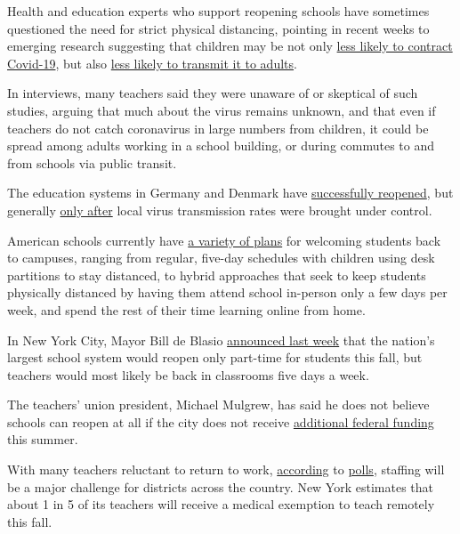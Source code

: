 Health and education experts who support reopening schools have
sometimes questioned the need for strict physical distancing, pointing
in recent weeks to emerging research suggesting that children may be not
only \href{https://pubmed.ncbi.nlm.nih.gov/32546824/}{less likely to
contract Covid-19}, but also
\href{https://pediatrics.aappublications.org/content/early/2020/07/08/peds.2020-004879}{less
likely to transmit it to adults}.

In interviews, many teachers said they were unaware of or skeptical of
such studies, arguing that much about the virus remains unknown, and
that even if teachers do not catch coronavirus in large numbers from
children, it could be spread among adults working in a school building,
or during commutes to and from schools via public transit.

The education systems in Germany and Denmark have
\href{https://www.nytimes.com/2020/05/10/world/europe/reopen-schools-germany.html}{successfully
reopened}, but generally
\href{https://www.sciencemag.org/news/2020/07/school-openings-across-globe-suggest-ways-keep-coronavirus-bay-despite-outbreaks}{only
after} local virus transmission rates were brought under control.

American schools currently have
\href{https://www.nytimes.com/2020/06/26/us/coronavirus-schools-reopen-fall.html}{a
variety of plans} for welcoming students back to campuses, ranging from
regular, five-day schedules with children using desk partitions to stay
distanced, to hybrid approaches that seek to keep students physically
distanced by having them attend school in-person only a few days per
week, and spend the rest of their time learning online from home.

In New York City, Mayor Bill de Blasio
\href{https://www.nytimes.com/2020/07/08/nyregion/nyc-schools-reopening-plan.html}{announced
last week} that the nation's largest school system would reopen only
part-time for students this
fall\href{https://www.nytimes.com/2020/07/08/nyregion/nyc-schools-reopening-plan.html}{,}
but teachers would most likely be back in classrooms five days a week.

The teachers' union president, Michael Mulgrew, has said he does not
believe schools can reopen at all if the city does not receive
\href{https://www.nytimes.com/2020/07/09/us/schools-reopen-fall.html}{additional
federal funding} this summer.

With many teachers reluctant to return to work,
\href{https://www.edweek.org/ew/articles/2020/06/03/most-educators-want-schools-to-stay-closed.html}{according}
to
\href{https://www.usatoday.com/story/news/education/2020/05/26/coronavirus-schools-teachers-poll-ipsos-parents-fall-online/5254729002/}{polls},
staffing will be a major challenge for districts across the country. New
York estimates that about 1 in 5 of its teachers will receive a medical
exemption to teach remotely this fall.

